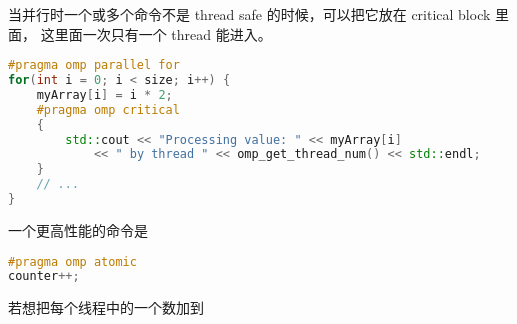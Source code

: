当并行时一个或多个命令不是 thread safe 的时候，可以把它放在 critical block 里面， 这里面一次只有一个 thread 能进入。
\begin{lstlisting}[language=cpp]
#pragma omp parallel for
for(int i = 0; i < size; i++) {
	myArray[i] = i * 2;
	#pragma omp critical
	{
		std::cout << "Processing value: " << myArray[i]
			<< " by thread " << omp_get_thread_num() << std::endl;
	}
	// ...
}
\end{lstlisting}

一个更高性能的命令是
\begin{lstlisting}[language=cpp]
#pragma omp atomic
counter++;
\end{lstlisting}

若想把每个线程中的一个数加到
